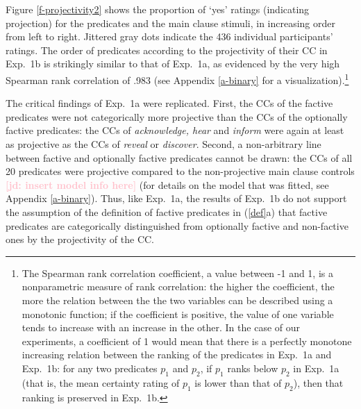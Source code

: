 \documentclass[11pt,fleqn]{article}
\newcommand{\jd}[1]{\textbf{\textcolor{Pink}{[jd: #1]}}}
\newcommand{\6}{\mbox{$[\hspace*{-.6mm}[$}}
\newcommand{\9}{\mbox{$]\hspace*{-.6mm}]$}}
\begin{document}
Figure \ref{f-projectivity2} shows the proportion of `yes' ratings (indicating projection) for the predicates and the main clause stimuli, in increasing order from left to right. Jittered gray dots indicate the 436 individual participants' ratings. The order of predicates according to the projectivity of their CC in Exp.~1b is strikingly similar to that of Exp.~1a, as evidenced by the very high Spearman rank correlation of .983 (see Appendix \ref{a-binary} for a visualization).\footnote{The Spearman rank correlation coefficient, a value between -1 and 1, is a nonparametric measure of rank correlation: the higher the coefficient, the more the relation between the the two variables can be described using a monotonic function; if the coefficient is positive, the value of one variable tends to increase with an increase in the other. In the case of our experiments, a coefficient of 1 would mean that there is a perfectly monotone increasing relation between the ranking of the predicates in Exp.~1a and Exp.~1b: for any two predicates $p_1$ and $p_2$, if $p_1$ ranks below $p_2$ in Exp.~1a (that is, the mean certainty rating of $p_1$ is lower than that of $p_2$), then that ranking is preserved in Exp.~1b.} 

The critical findings of Exp.~1a were replicated. First, the CCs of the factive predicates were not categorically more projective than the CCs of the optionally factive predicates:  the CCs of {\em acknowledge, hear} and {\em inform} were again at least as projective as the CCs of {\em reveal} or {\em discover}. Second, a non-arbitrary line between factive and optionally factive predicates cannot be drawn: the CCs of all 20 predicates were projective compared to the non-projective main clause controls \jd{insert model info here} (for details on the model that was fitted, see Appendix \ref{a-binary}). Thus, like Exp.~1a, the results of Exp.~1b do not support the assumption of the definition of factive predicates in (\ref{def}a) that factive predicates are categorically distinguished from optionally factive and non-factive ones by the projectivity of the CC.
\end{document}
